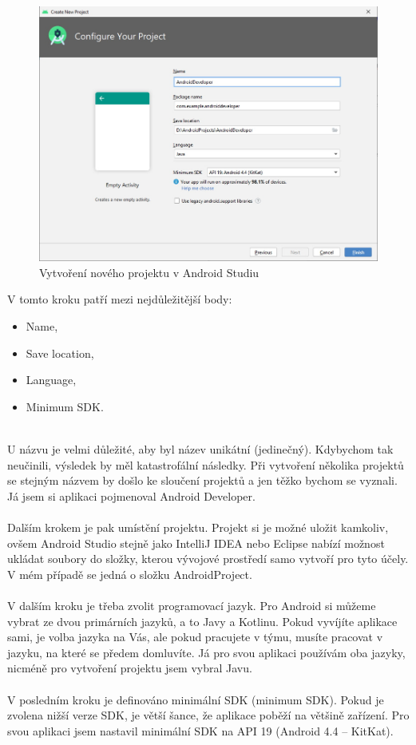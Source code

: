 \documentclass{vskpou} %
\begin{document}
 \begin{figure}[h!]
\centering
\includegraphics[scale=0.5]{images/17.jpg}
\caption{Vytvoření nového projektu v Android Studiu}
\label{17}
\end{figure}
\newpage
V tomto kroku patří mezi nejdůležitější body:

\begin{itemize}
    \item {Name},
    \item {Save location},
    \item {Language},
    \item {Minimum SDK}. 
   
\end{itemize}
\\
U názvu je velmi důležité, aby byl název unikátní (jedinečný). Kdybychom tak neučinili, výsledek by měl katastrofální následky. Při vytvoření několika projektů se stejným názvem by došlo ke sloučení projektů a jen těžko bychom se vyznali. Já jsem si aplikaci pojmenoval Android Developer.\\
\\Dalším krokem je pak umístění projektu. Projekt si je možné uložit kamkoliv, ovšem Android Studio stejně jako IntelliJ IDEA nebo Eclipse nabízí možnost ukládat soubory do složky, kterou vývojové prostředí samo vytvoří pro tyto účely. V mém případě se jedná o složku AndroidProject.\\
\\V dalším kroku je třeba zvolit programovací jazyk. Pro Android si můžeme vybrat ze dvou primárních jazyků, a to Javy a Kotlinu. Pokud vyvíjíte aplikace sami, je volba jazyka na Vás, ale pokud pracujete v týmu, musíte pracovat v jazyku, na které se předem domluvíte. Já pro svou aplikaci používám oba jazyky, nicméně pro vytvoření projektu jsem vybral Javu.\\
\\V posledním kroku je definováno minimální SDK (minimum SDK). Pokud je zvolena nižší verze SDK, je větší šance, že aplikace poběží na většině zařízení. Pro svou aplikaci jsem nastavil minimální SDK na API 19 (Android 4.4 – KitKat).
\end{document}
